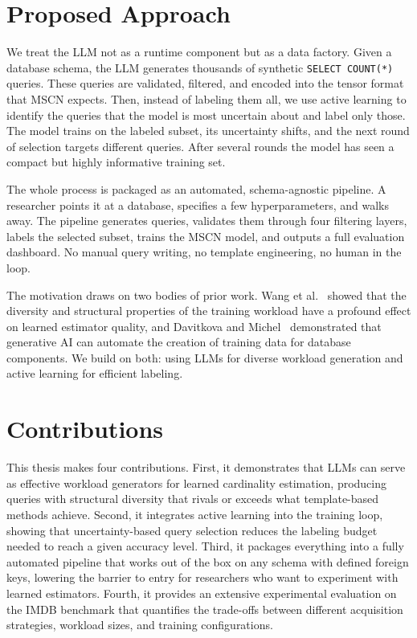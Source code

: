 \section{Proposed Approach}

We treat the LLM not as a runtime component but as a data factory. Given a database schema, the LLM generates thousands of synthetic \texttt{SELECT COUNT(*)} queries. These queries are validated, filtered, and encoded into the tensor format that MSCN expects. Then, instead of labeling them all, we use active learning to identify the queries that the model is most uncertain about and label only those. The model trains on the labeled subset, its uncertainty shifts, and the next round of selection targets different queries. After several rounds the model has seen a compact but highly informative training set.

The whole process is packaged as an automated, schema-agnostic pipeline. A researcher points it at a database, specifies a few hyperparameters, and walks away. The pipeline generates queries, validates them through four filtering layers, labels the selected subset, trains the MSCN model, and outputs a full evaluation dashboard. No manual query writing, no template engineering, no human in the loop.

The motivation draws on two bodies of prior work. Wang et al.~\cite{DBLP:journals/pvldb/WangQWWZ21} showed that the diversity and structural properties of the training workload have a profound effect on learned estimator quality, and Davitkova and Michel~\cite{DBLP:journals/corr/abs-2512-20271} demonstrated that generative AI can automate the creation of training data for database components. We build on both: using LLMs for diverse workload generation and active learning for efficient labeling.

\section{Contributions}

This thesis makes four contributions. First, it demonstrates that LLMs can serve as effective workload generators for learned cardinality estimation, producing queries with structural diversity that rivals or exceeds what template-based methods achieve. Second, it integrates active learning into the training loop, showing that uncertainty-based query selection reduces the labeling budget needed to reach a given accuracy level. Third, it packages everything into a fully automated pipeline that works out of the box on any schema with defined foreign keys, lowering the barrier to entry for researchers who want to experiment with learned estimators. Fourth, it provides an extensive experimental evaluation on the IMDB benchmark that quantifies the trade-offs between different acquisition strategies, workload sizes, and training configurations.